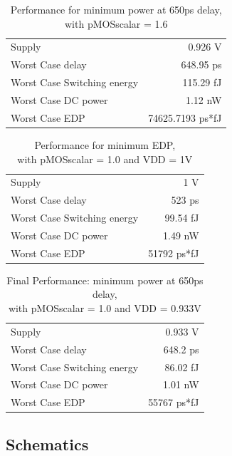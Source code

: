 \documentclass[english]{article}
\begin{document}
\begin{table}[h]
\centering
\begin{tabular}{ |l|r| }
\hline
Supply	&	0.926 V \\
Worst Case delay &            648.95 ps \\
Worst Case Switching energy & 115.29 fJ \\
Worst Case DC power &         1.12 nW \\
Worst Case EDP &              74625.7193 ps*fJ \\
\hline
\end{tabular}
\caption{Performance for minimum power at 650ps delay, \\ with pMOSscalar = 1.6}
\label{PowerPerformancePMOS1.6}
\end{table}  

\begin{table}[h]
\centering
\begin{tabular}{ |l|r| }
\hline
Supply	&	1 V \\
Worst Case delay &            523 ps \\
Worst Case Switching energy & 99.54 fJ \\
Worst Case DC power &         1.49 nW \\
Worst Case EDP &              51792 ps*fJ \\
\hline
\end{tabular}
\caption{Performance for minimum EDP, \\ with pMOSscalar = 1.0 and VDD = 1V}
\label{bestEDP}
\end{table} 

\begin{table}[h]
\centering
\begin{tabular}{ |l|r| }
\hline
Supply	&	0.933 V \\
Worst Case delay &            648.2 ps \\
Worst Case Switching energy & 86.02 fJ \\
Worst Case DC power &         1.01 nW \\
Worst Case EDP &              55767 ps*fJ \\
\hline
\end{tabular}
\caption{Final Performance: minimum power at 650ps delay, \\ with pMOSscalar = 1.0 and VDD = 0.933V}
\label{PowerPerformancePmos1.0}
\end{table}  

\newpage{}


\subsection{Schematics} \label{subsec:Schematics}
\end{document}
